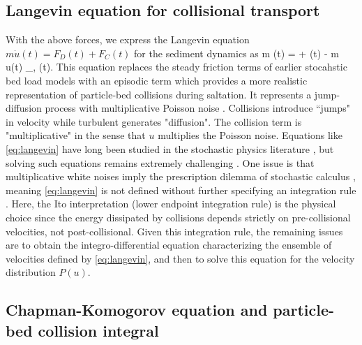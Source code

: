 \subsection{Langevin equation for collisional transport}

With the above forces, we express the Langevin equation $m\dot{u}(t) = F_D(t) + F_C(t)$ for the sediment dynamics as
\be m (t) = \Gamma + \eta(t) - m u(t) \xi_{\nu, \ve}(t). \label{eq:langevin} \ee
This equation replaces the steady friction terms of earlier stocahstic bed load models with an episodic term which provides a more realistic representation of particle-bed collisions during saltation.
It represents a jump-diffusion process \citep{Daly2006} with multiplicative Poisson noise \citep{Dubkov2016,Denisov2009}. 
Collisions introduce ``jumps" in velocity while turbulent generates "diffusion".
The collision term is "multiplicative" in the sense that $u$ multiplies the Poisson noise.
Equations like \ref{eq:langevin} have long been studied in the stochastic physics literature \citep{Hanggi1978,VanDenBroeck1983}, but solving such equations remains extremely challenging \citep{Luczka1995,Daly2010,Mau2014,Dubkov2016,Dubkov2019}.
One issue is that multiplicative white noises imply the prescription dilemma of stochastic calculus \citep{Risken1989,Gardiner1983}, meaning \ref{eq:langevin} is not defined without further specifying an integration rule \citep{Suweis2011}.
Here, the Ito interpretation (lower endpoint integration rule) is the physical choice since the energy dissipated by collisions depends strictly on pre-collisional velocities, not post-collisional.
Given this integration rule, the remaining issues are to obtain the integro-differential equation characterizing the ensemble of velocities defined by \ref{eq:langevin}, and then to solve this equation for the velocity distribution $P(u)$.

\subsection{Chapman-Komogorov equation and particle-bed collision integral}

